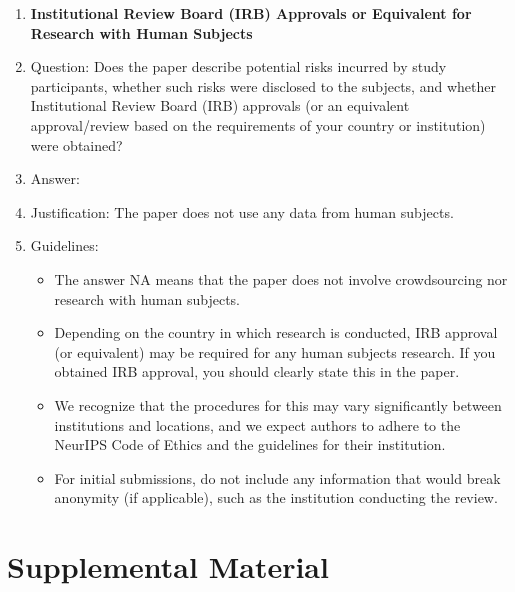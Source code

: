 \documentclass{article} %
\newcounter{ct}
\theoremstyle{definition}
\theoremstyle{remark}
\begin{document}
\begin{enumerate}
\item {\bf Institutional Review Board (IRB) Approvals or Equivalent for Research with Human Subjects}
    \item[] Question: Does the paper describe potential risks incurred by study participants, whether such risks were disclosed to the subjects, and whether Institutional Review Board (IRB) approvals (or an equivalent approval/review based on the requirements of your country or institution) were obtained?
    \item[] Answer:  \answerNA{} %
    \item[] Justification: The paper does not use any data from human subjects.
    \item[] Guidelines:
    \begin{itemize}
        \item The answer NA means that the paper does not involve crowdsourcing nor research with human subjects.
        \item Depending on the country in which research is conducted, IRB approval (or equivalent) may be required for any human subjects research. If you obtained IRB approval, you should clearly state this in the paper.
        \item We recognize that the procedures for this may vary significantly between institutions and locations, and we expect authors to adhere to the NeurIPS Code of Ethics and the guidelines for their institution.
        \item For initial submissions, do not include any information that would break anonymity (if applicable), such as the institution conducting the review.
    \end{itemize}

\end{enumerate}
\fi

\newpage
\appendix
\section*{Supplemental Material}
\setcounter{section}{0}
\renewcommand{\thefigure}{S\arabic{figure}} %
\renewcommand{\thesection}{S\arabic{section}} %
\end{document}
